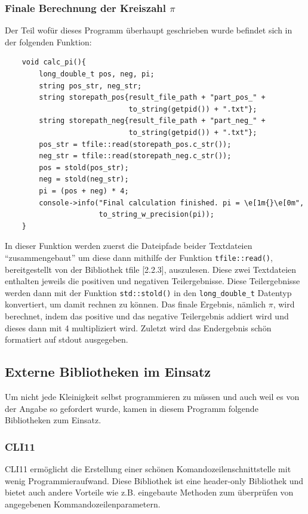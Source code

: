 \documentclass[12pt]{article}
\begin{document}
\subsubsection{Finale Berechnung der Kreiszahl $\pi$}
Der Teil wofür dieses Programm überhaupt geschrieben wurde befindet sich in
der folgenden Funktion:
\newpage
\begin{verbatim}
    void calc_pi(){
        long_double_t pos, neg, pi;
        string pos_str, neg_str;
        string storepath_pos{result_file_path + "part_pos_" + 
                             to_string(getpid()) + ".txt"};
        string storepath_neg{result_file_path + "part_neg_" + 
                             to_string(getpid()) + ".txt"};
        pos_str = tfile::read(storepath_pos.c_str());
        neg_str = tfile::read(storepath_neg.c_str());
        pos = stold(pos_str);
        neg = stold(neg_str);
        pi = (pos + neg) * 4;
        console->info("Final calculation finished. pi = \e[1m{}\e[0m", 
                      to_string_w_precision(pi));
    }
\end{verbatim}
In dieser Funktion werden zuerst die Dateipfade beider Textdateien 
"`zusammengebaut"' um diese dann mithilfe der Funktion 
\texttt{tfile::read()}, bereitgestellt von der Bibliothek tfile [2.2.3], 
auszulesen. Diese zwei Textdateien enthalten jeweils die positiven und 
negativen Teilergebnisse. Diese Teilergebnisse werden dann mit der Funktion 
\texttt{std::stold()} in den \texttt{long\_double\_t} Datentyp konvertiert, um 
damit rechnen zu können. Das finale Ergebnis, nämlich $\pi$, wird berechnet,
indem das positive und das negative Teilergebnis addiert wird und dieses dann 
mit 4 multipliziert wird. Zuletzt wird das Endergebnis schön formatiert auf 
stdout ausgegeben.
\subsection{Externe Bibliotheken im Einsatz}
Um nicht jede Kleinigkeit selbst programmieren zu müssen und auch weil es von
der Angabe so gefordert wurde, kamen in diesem Programm folgende Bibliotheken 
zum Einsatz.
\subsubsection{CLI11}
CLI11 \cite{cli11} ermöglicht die Erstellung einer schönen 
Komandozeilenschnittstelle mit wenig Programmieraufwand. Diese Bibliothek ist 
eine header-only Bibliothek und bietet auch andere Vorteile wie z.B. eingebaute 
Methoden zum überprüfen von angegebenen Kommandozeilenparametern.
\end{document}
